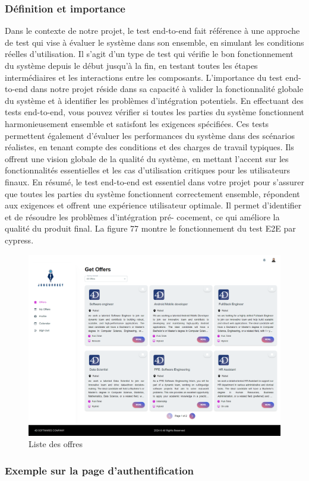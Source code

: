 \subsubsection{Définition et importance}

Dans le contexte de notre projet, le test end-to-end fait référence à une approche de test qui vise à évaluer le système dans son ensemble, en simulant
\newline 
les conditions réelles d’utilisation. Il s’agit d’un type de test qui vérifie le bon fonctionnement du système depuis le début jusqu’à la fin, en testant toutes les étapes intermédiaires et les  interactions entre les  composants. L’importance du test end-to-end dans notre projet réside dans sa capacité  à valider  la fonctionnalité globale du système et à identifier les problèmes d’intégration potentiels. En effectuant des tests end-to-end, vous pouvez vérifier si toutes les parties du système fonctionnent harmonieusement ensemble et satisfont les exigences spécifiées.
\newline
Ces tests permettent également d’évaluer  les  performances  du  système dans des scénarios réalistes, en tenant compte des conditions et des charges de travail typiques. Ils offrent une vision globale de la  qualité  du  système,  en mettant l’accent sur les fonctionnalités essentielles et les  cas  d’utilisation critiques pour les utilisateurs finaux. En résumé, le test end-to-end est essentiel dans votre projet pour s’assurer que toutes les parties du système fonctionnent correctement ensemble, répondent aux exigences et offrent une expérience utilisateur optimale. Il permet d’identifier et de résoudre les problèmes d’intégration pré- cocement, ce qui améliore la  qualité  du  produit  final.  La figure 77 montre le fonctionnement du test E2E par cypress.
\begin{figure}[htbp]
   \centering
   \includegraphics[scale=0.2]{screens/listOffers.png} 
   \caption{Liste des offres}
   \label{fig:listOffers}
\end{figure}



\subsubsection{Exemple sur la page d’authentification}

